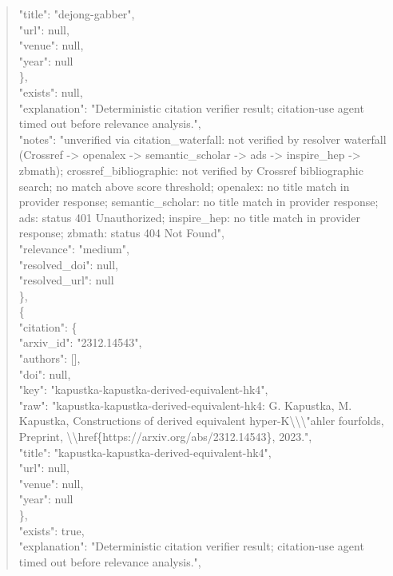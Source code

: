 \documentclass[11pt]{article}
\begin{document}
\begin{quote}
        "title": "dejong-gabber",\\
        "url": null,\\
        "venue": null,\\
        "year": null\\
      \},\\
      "exists": null,\\
      "explanation": "Deterministic citation verifier result; citation-use agent timed out before relevance analysis.",\\
      "notes": "unverified via citation\_waterfall: not verified by resolver waterfall (Crossref -> openalex -> semantic\_scholar -> ads -> inspire\_hep -> zbmath); crossref\_bibliographic: not verified by Crossref bibliographic search; no match above score threshold; openalex: no title match in provider response; semantic\_scholar: no title match in provider response; ads: status 401 Unauthorized; inspire\_hep: no title match in provider response; zbmath: status 404 Not Found",\\
      "relevance": "medium",\\
      "resolved\_doi": null,\\
      "resolved\_url": null\\
    \},\\
    \{\\
      "citation": \{\\
        "arxiv\_id": "2312.14543",\\
        "authors": [],\\
        "doi": null,\\
        "key": "kapustka-kapustka-derived-equivalent-hk4",\\
        "raw": "kapustka-kapustka-derived-equivalent-hk4: G. Kapustka, M. Kapustka, Constructions of derived equivalent hyper-K\textbackslash{}\textbackslash{}\textbackslash{}"ahler fourfolds, Preprint, \textbackslash{}\textbackslash{}href\{https://arxiv.org/abs/2312.14543\}, 2023.",\\
        "title": "kapustka-kapustka-derived-equivalent-hk4",\\
        "url": null,\\
        "venue": null,\\
        "year": null\\
      \},\\
      "exists": true,\\
      "explanation": "Deterministic citation verifier result; citation-use agent timed out before relevance analysis.",\\

\end{quote}
\end{document}

